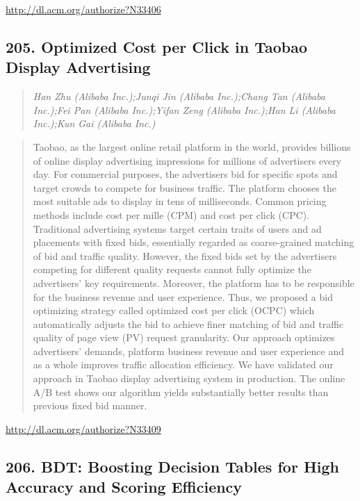 \documentclass{article}
\begin{document}
\href{http://dl.acm.org/authorize?N33406}{http://dl.acm.org/authorize?N33406}

\subsection{205. Optimized Cost per Click in Taobao Display Advertising}

\begin{quote}
\footnotesize{\textit{Han Zhu (Alibaba Inc.);Junqi Jin (Alibaba Inc.);Chang Tan (Alibaba Inc.);Fei Pan (Alibaba Inc.);Yifan Zeng (Alibaba Inc.);Han Li (Alibaba Inc.);Kun Gai (Alibaba Inc.)}}

\end{quote}

\begin{quote}
Taobao, as the largest online retail platform in the world, provides billions of online display advertising impressions for millions of advertisers every day. For commercial purposes, the advertisers bid for specific spots and target crowds to compete for business traffic. The platform chooses the most suitable ads to display in tens of milliseconds. Common pricing methods include cost per mille (CPM) and cost per click (CPC). Traditional advertising systems target certain traits of users and ad placements with fixed bids, essentially regarded as coarse-grained matching of bid and traffic quality. However, the fixed bids set by the advertisers competing for different quality requests cannot fully optimize the advertisers’ key requirements. Moreover, the platform has to be responsible for the business revenue and user experience. Thus, we proposed a bid optimizing strategy called optimized cost per click (OCPC) which automatically adjusts the bid to achieve finer matching of bid and traffic quality of page view (PV) request granularity. Our approach optimizes advertisers’ demands, platform business revenue and user experience and as a whole improves traffic allocation efficiency. We have validated our approach in Taobao display advertising system in production. The online A/B test shows our algorithm yields substantially better results than previous fixed bid manner.
\end{quote}

\href{http://dl.acm.org/authorize?N33409}{http://dl.acm.org/authorize?N33409}

\subsection{206. BDT: Boosting Decision Tables for High Accuracy and Scoring Efficiency}
\end{document}
